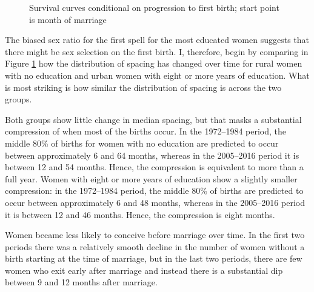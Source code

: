 \documentclass[12pt,letterpaper]{article}
\begin{document}
\begin{figure}[htpb]
\centering
\setcounter{subfigure}{-1}
\setcounter{subfigure}{0}
\caption{
Survival curves conditional on progression to first birth; start point is month of marriage
}
\label{fig:pps_spell1}
\end{figure}

The biased sex ratio for the first spell for the most educated 
women suggests that there might be sex selection on the first birth.
I, therefore, begin by comparing in Figure \ref{fig:pps_spell1} how the distribution 
of spacing has changed over time for rural women with no education and urban women 
with eight or more years of education.
What is most striking is how similar the distribution of spacing is across the
two groups.

Both groups show little change in median spacing, but that masks a substantial
compression of when most of the births occur.
In the 1972--1984 period, the middle 80\% of births for women with no education 
are predicted to occur between approximately 6 and 64 months, whereas in the 
2005--2016 period it is between 12 and 54 months.
Hence, the compression is equivalent to more than a full year.
Women with eight or more years of education show a slightly smaller compression:
in the 1972--1984 period, the middle 80\% of births are predicted to occur between
approximately 6 and 48 months, whereas in the 2005--2016 period it is between
12 and 46 months.
Hence, the compression is eight months.

Women became less likely to conceive before marriage over time.
In the first two periods there was a relatively smooth decline in the number of
women without a birth starting at the time of marriage, but in the last two
periods, there are few women who exit early after marriage and
instead there is a substantial dip between 9 and 12 months after
marriage.
\end{document}
